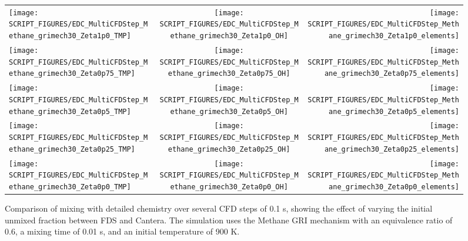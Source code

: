 \documentclass[11pt]{book}
\begin{document}
\begin{figure}[p]
\begin{tabular*}{\textwidth}{lcr}
\texttt{[image: SCRIPT\_FIGURES/EDC\_MultiCFDStep\_Methane\_grimech30\_Zeta1p0\_TMP]} &
\texttt{[image: SCRIPT\_FIGURES/EDC\_MultiCFDStep\_Methane\_grimech30\_Zeta1p0\_OH]} &
\texttt{[image: SCRIPT\_FIGURES/EDC\_MultiCFDStep\_Methane\_grimech30\_Zeta1p0\_elements]} \\
\texttt{[image: SCRIPT\_FIGURES/EDC\_MultiCFDStep\_Methane\_grimech30\_Zeta0p75\_TMP]} &
\texttt{[image: SCRIPT\_FIGURES/EDC\_MultiCFDStep\_Methane\_grimech30\_Zeta0p75\_OH]} &
\texttt{[image: SCRIPT\_FIGURES/EDC\_MultiCFDStep\_Methane\_grimech30\_Zeta0p75\_elements]} \\
\texttt{[image: SCRIPT\_FIGURES/EDC\_MultiCFDStep\_Methane\_grimech30\_Zeta0p5\_TMP]} &
\texttt{[image: SCRIPT\_FIGURES/EDC\_MultiCFDStep\_Methane\_grimech30\_Zeta0p5\_OH]} &
\texttt{[image: SCRIPT\_FIGURES/EDC\_MultiCFDStep\_Methane\_grimech30\_Zeta0p5\_elements]} \\
\texttt{[image: SCRIPT\_FIGURES/EDC\_MultiCFDStep\_Methane\_grimech30\_Zeta0p25\_TMP]} &
\texttt{[image: SCRIPT\_FIGURES/EDC\_MultiCFDStep\_Methane\_grimech30\_Zeta0p25\_OH]} &
\texttt{[image: SCRIPT\_FIGURES/EDC\_MultiCFDStep\_Methane\_grimech30\_Zeta0p25\_elements]} \\
\texttt{[image: SCRIPT\_FIGURES/EDC\_MultiCFDStep\_Methane\_grimech30\_Zeta0p0\_TMP]} &
\texttt{[image: SCRIPT\_FIGURES/EDC\_MultiCFDStep\_Methane\_grimech30\_Zeta0p0\_OH]} &
\texttt{[image: SCRIPT\_FIGURES/EDC\_MultiCFDStep\_Methane\_grimech30\_Zeta0p0\_elements]} \\
\end{tabular*}
\caption[Results of the  test cases]{Comparison of mixing with detailed chemistry over several CFD steps of 0.1 s, showing the effect of varying the initial unmixed fraction between FDS and Cantera. The simulation uses the Methane GRI mechanism with an equivalence ratio of 0.6, a mixing time of 0.01 s, and an initial temperature of 900 K.}
\label{fig:edc_mixing_cvode_multicfdstep_vary_zeta0}
\end{figure}
\end{document}
